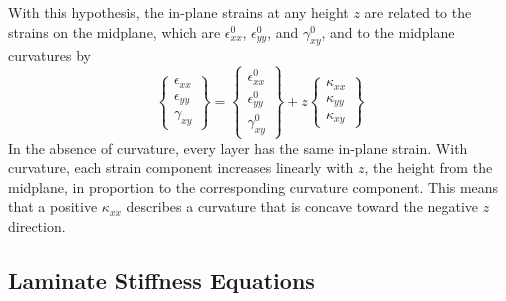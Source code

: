 \documentclass[11pt]{article}
\begin{document}
With this hypothesis, the in-plane strains at any height $z$ are related to the strains on the midplane, which are $\epsilon^0_{xx}$, $\epsilon^0_{yy}$, and $\gamma^0_{xy}$, and to the midplane curvatures by
\begin{equation}
\renewcommand\arraystretch{1.2}
        \left\{ \begin{array}{c}
           \epsilon_{xx}  \\  \epsilon_{yy}  \\  \gamma_{xy}
           \end{array} \right\}
           =
        \left\{ \begin{array}{c}
           \epsilon^0_{xx}  \\  \epsilon^0_{yy}  \\  \gamma^0_{xy}
           \end{array} \right\}
           + z
        \left\{ \begin{array}{c}
           \kappa_{xx}  \\  \kappa_{yy}  \\  \kappa_{xy}
           \end{array} \right\}
     \label{Kirchoff}
\end{equation}
In the absence of curvature, every layer has the same in-plane strain.  With curvature, each strain component increases linearly with $z$, the height from the midplane, in proportion to the corresponding curvature component.  This means that a positive $\kappa_{xx}$ describes a curvature that is concave toward the negative $z$ direction.  

\subsection*{Laminate Stiffness Equations}
\end{document}
